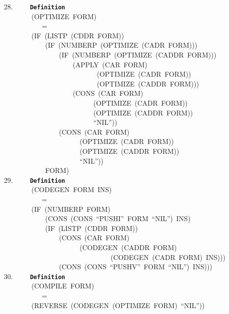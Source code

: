 \documentclass[11pt]{book}
\newenvironment{pubasis}{\begin{flushleft}\ttfamily\small}{\normalsize\rmfamily\end{flushleft}}
\newcommand{\axiomordefinition}[1]{\vspace{6pt}\texttt{\textbf{#1}}}
\begin{document}
\begin{pubasis}
28.~~~~~\axiomordefinition{Definition}\\
~~~~~~~~(OPTIMIZE~FORM)\\
~~~~~~~~~~~=\\
~~~~~~~~(IF~(LISTP~(CDDR~FORM))\\
~~~~~~~~~~~~(IF~(NUMBERP~(OPTIMIZE~(CADR~FORM)))\\
~~~~~~~~~~~~~~~~(IF~(NUMBERP~(OPTIMIZE~(CADDR~FORM)))\\
~~~~~~~~~~~~~~~~~~~~(APPLY~(CAR~FORM)\\
~~~~~~~~~~~~~~~~~~~~~~~~~~~(OPTIMIZE~(CADR~FORM))\\
~~~~~~~~~~~~~~~~~~~~~~~~~~~(OPTIMIZE~(CADDR~FORM)))\\
~~~~~~~~~~~~~~~~~~~~(CONS~(CAR~FORM)\\
~~~~~~~~~~~~~~~~~~~~~~~~~~(OPTIMIZE~(CADR~FORM))\\
~~~~~~~~~~~~~~~~~~~~~~~~~~(OPTIMIZE~(CADDR~FORM))\\
~~~~~~~~~~~~~~~~~~~~~~~~~~``NIL''))\\
~~~~~~~~~~~~~~~~(CONS~(CAR~FORM)\\
~~~~~~~~~~~~~~~~~~~~~~(OPTIMIZE~(CADR~FORM))\\
~~~~~~~~~~~~~~~~~~~~~~(OPTIMIZE~(CADDR~FORM))\\
~~~~~~~~~~~~~~~~~~~~~~``NIL''))\\
~~~~~~~~~~~~FORM)\\

29.~~~~~\axiomordefinition{Definition}\\
~~~~~~~~(CODEGEN~FORM~INS)\\
~~~~~~~~~~~=\\
~~~~~~~~(IF~(NUMBERP~FORM)\\
~~~~~~~~~~~~(CONS~(CONS~``PUSHI''~FORM~``NIL'')~INS)\\
~~~~~~~~~~~~(IF~(LISTP~(CDDR~FORM))\\
~~~~~~~~~~~~~~~~(CONS~(CAR~FORM)\\
~~~~~~~~~~~~~~~~~~~~~~(CODEGEN~(CADDR~FORM)\\
~~~~~~~~~~~~~~~~~~~~~~~~~~~~~~~(CODEGEN~(CADR~FORM)~INS)))\\
~~~~~~~~~~~~~~~~(CONS~(CONS~``PUSHV''~FORM~``NIL'')~INS)))\\

30.~~~~~\axiomordefinition{Definition}\\
~~~~~~~~(COMPILE~FORM)\\
~~~~~~~~~~~=\\
~~~~~~~~(REVERSE~(CODEGEN~(OPTIMIZE~FORM)~``NIL''))\\


\end{pubasis}
\end{document}
